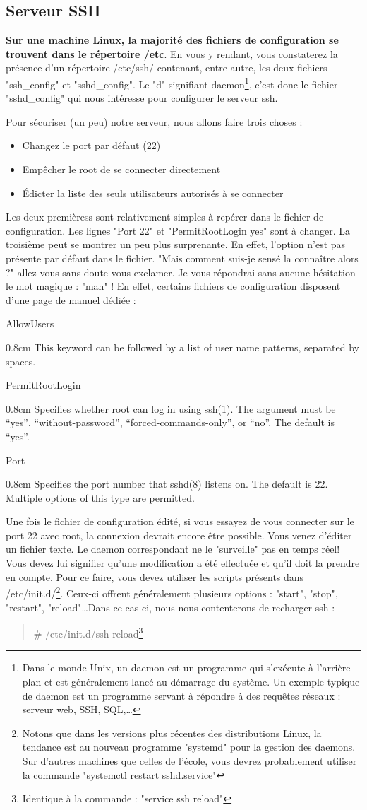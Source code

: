 \documentclass[a4paper,11pt]{article}
\newcommand{\commande}[1] {
    \begin{quote}
    \tt\raggedright #1 
    \end{quote}
}
\newcommand{\man}[2]{
    \begin{tcolorbox}[toprule=3mm,width=\textwidth,outer arc=0mm,colbacktitle=grayman,coltitle=black,colback={grayman},colframe={grayman},title={man : \tt #1}]
        \tt\raggedright #2
    \end{tcolorbox}
}
\newcommand{\mandesc}[1]{
    \begin{adjustwidth}{0.8cm}{}
        #1
    \end{adjustwidth}
}
\begin{document}
\subsection{Serveur SSH}
\par \textbf{Sur une machine Linux, la majorité des fichiers de configuration se trouvent dans le répertoire /etc}. En vous y rendant, vous constaterez la présence d'un répertoire /etc/ssh/ contenant, entre autre, les deux fichiers "ssh\_config" et "sshd\_config". Le "d" signifiant daemon\footnote{Dans le monde Unix, un daemon est un programme qui s'exécute à l'arrière plan et est généralement lancé au démarrage du système. Un exemple typique de daemon est un programme servant à répondre à des requêtes réseaux : serveur web, SSH, SQL,\dots }, c'est donc le fichier "sshd\_config" qui nous intéresse pour configurer le serveur ssh.
\par Pour sécuriser (un peu) notre serveur, nous allons faire trois choses :
\begin{itemize}
    \item Changez le port par défaut (22)
    \item Empêcher le root de se connecter directement
    \item Édicter la liste des seuls utilisateurs autorisés à se connecter
\end{itemize}
\par Les deux premièress sont relativement simples à repérer dans le fichier de configuration. Les lignes "Port 22" et "PermitRootLogin yes" sont à changer. La troisième peut se montrer un peu plus surprenante. En effet, l'option n'est pas présente par défaut dans le fichier. "Mais comment suis-je sensé la connaître alors ?" allez-vous sans doute vous exclamer. Je vous répondrai sans aucune hésitation le mot magique : "man" ! En effet, certains fichiers de configuration disposent d'une page de manuel dédiée :
\man{sshd\_config}{
AllowUsers
\mandesc{This keyword can be followed by a list of user name patterns, separated by spaces.}
PermitRootLogin
\mandesc{Specifies whether root can log in using ssh(1).  The argument must be “yes”, “without-password”, “forced-commands-only”, or “no”. The default is “yes”.}
Port
\mandesc{Specifies the port number that sshd(8) listens on.  The default is 22.  Multiple options of this type are permitted.}
}
\par Une fois le fichier de configuration édité, si vous essayez de vous connecter sur le port 22 avec root, la connexion devrait encore être possible. Vous venez d'éditer un fichier texte. Le daemon correspondant ne le "surveille" pas en temps réel! Vous devez lui signifier qu'une modification a été effectuée et qu'il doit la prendre en compte. Pour ce faire, vous devez utiliser les scripts présents dans /etc/init.d/\footnote{Notons que dans les versions plus récentes des distributions Linux, la tendance est au nouveau programme "systemd" pour la gestion des daemons. Sur d'autres machines que celles de l'école, vous devrez probablement utiliser la commande "systemctl restart sshd.service"}. Ceux-ci offrent généralement plusieurs options : "start", "stop", "restart", "reload"\ldots Dans ce cas-ci, nous nous contenterons de recharger ssh :
\commande{\# /etc/init.d/ssh reload\footnote{Identique à la commande : "service ssh reload"}}
\end{document}
